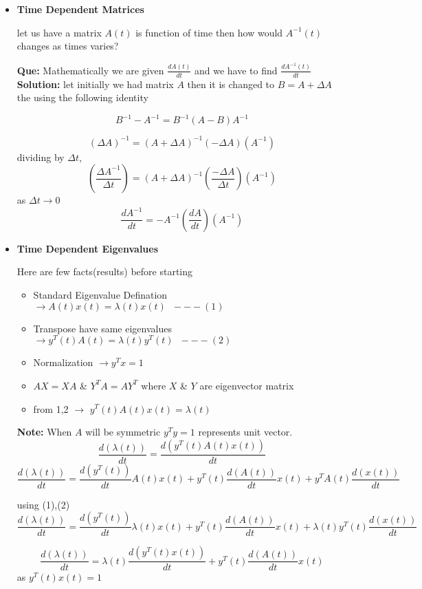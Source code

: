 \documentclass[a4paper]{article}
\numberwithin{equation}{section}
\begin{document}
\begin{itemize}
\item \textbf{Time Dependent Matrices}

let us have a matrix $A(t)$ is function of time then how would $A^{-1}(t)$ changes as times varies?

\textbf{Que:} Mathematically we are given $\frac{dA(t)}{dt}$ and we have to find $\frac{dA^{-1}(t)}{dt}$\\

\textbf{Solution:} let initially we had matrix $A$ then it is changed to $B=A+\Delta A$ the using the following identity

\[\boxed{B^{-1}-A^{-1}=B^{-1}(A-B)A^{-1}}\]

\[(\Delta A)^{-1}=(A+\Delta A)^{-1}(-\Delta A)(A^{-1})\]
dividing by $\Delta t$,
\[\left(\frac{\Delta A^{-1}}{\Delta t}\right)=\left(A+\Delta A\right)^{-1}\left(\frac{-\Delta A}{\Delta t}\right)(A^{-1})\]
as $\Delta t\rightarrow 0$
\[\boxed{\frac{d A^{-1}}{d t}=-A^{-1}\left(\frac{d A}{d t}\right)(A^{-1})}\]

\item \textbf{Time Dependent Eigenvalues} 

Here are few facts(results) before starting
\begin{itemize}
    \item Standard Eigenvalue Defination $\rightarrow{{A(t){x}(t)=\lambda(t){x}(t)}} \hspace{7pt}---(1)$
    \item Transpose have same eigenvalues $\rightarrow{{y^T(t)A(t)=\lambda(t){y^T}(t)}} \hspace{7pt}---(2)$
    \item Normalization $\rightarrow{y^Tx=1}$ 
    \item $AX=XA$ \& $Y^TA=AY^T$ where $X$ \& $Y$ are eigenvector matrix
    \item from 1,2 $\rightarrow$ $y^T(t)A(t)x(t)=\lambda(t)$
\end{itemize}

\textbf{Note:} When $A$ will be symmetric $y^Ty=1$  represents unit vector.
\[\frac{d(\lambda(t))}{dt}=\frac{d\left(y^T(t)A(t)x(t)\right)}{dt}\]
\[\frac{d(\lambda(t))}{dt}=\frac{d(y^T(t))}{dt}A(t)x(t)+y^T(t)\frac{d(A(t))}{dt}x(t)+y^TA(t)\frac{d(x(t))}{dt}\]

using (1),(2) 
\[\frac{d(\lambda(t))}{dt}=\frac{d(y^T(t))}{dt}\lambda(t)x(t)+y^T(t)\frac{d(A(t))}{dt}x(t)+\lambda(t)y^T(t)\frac{d(x(t))}{dt}\]

\[\frac{d(\lambda(t))}{dt}=\lambda(t)\frac{d\left(y^T(t)x(t)\right)}{dt}+y^T(t)\frac{d(A(t))}{dt}x(t)\]
as $y^T(t)x(t)=1$


\end{itemize}
\end{document}
